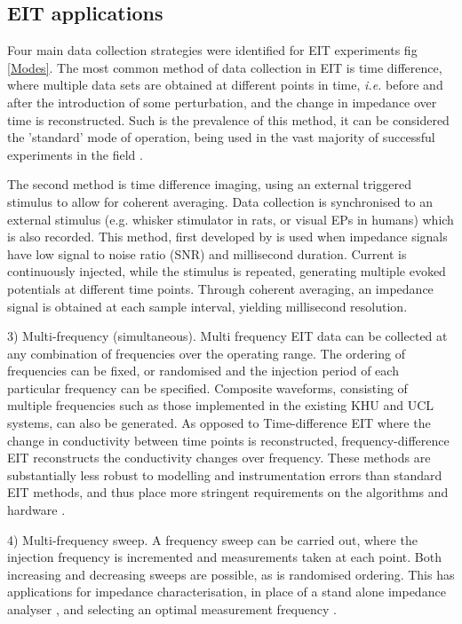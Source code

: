 \subsection{EIT applications}
Four main data collection strategies were identified for EIT experiments fig \ref{Modes}.  The most common method of data collection in EIT is time difference, where multiple data sets are obtained at different points in time, \emph{i.e.} before and after the introduction of some perturbation, and the change in impedance over time is reconstructed. Such is the prevalence of this method, it can be considered the 'standard' mode of operation, being used in the vast majority of successful experiments in the field \cite{bayford2012bioimpedance}.

The second method is time difference imaging, using an external triggered stimulus to allow for coherent averaging. Data collection is synchronised to an external stimulus (e.g. whisker stimulator in rats, or visual EPs in humans) which is also recorded. This method, first developed by \citet{Oh2011} is used when impedance signals have low signal to noise ratio (SNR) and millisecond duration. Current is continuously injected, while the stimulus is repeated, generating multiple evoked potentials at different time points. Through coherent averaging, an impedance signal is obtained at each sample interval, yielding millisecond resolution. 

3) Multi-frequency (simultaneous). Multi frequency EIT data can be collected at any combination of frequencies over the operating range. The ordering of frequencies can be fixed, or randomised and the injection period of each particular frequency can be specified. Composite waveforms, consisting of multiple frequencies such as those implemented in the existing KHU \cite{Hun_Wi_2014} and UCL \cite{McEwan_2006} systems, can also be generated. As opposed to Time-difference EIT where the change in conductivity between time points is reconstructed, frequency-difference EIT reconstructs the conductivity changes over frequency. These methods are substantially less robust to modelling and instrumentation errors than standard EIT methods, and thus place more stringent requirements on the algorithms and hardware \cite{Ahn2011} \cite{Malone2014}.

4) Multi-frequency sweep. A frequency sweep can be carried out, where the injection frequency is incremented and measurements taken at each point. Both increasing and decreasing sweeps are possible, as is randomised ordering. This has applications for impedance characterisation, in place of a stand alone impedance analyser \cite{Gabriel_2009}, and selecting an optimal measurement frequency \cite{VongerichtenASantosGAristovichK2013}.